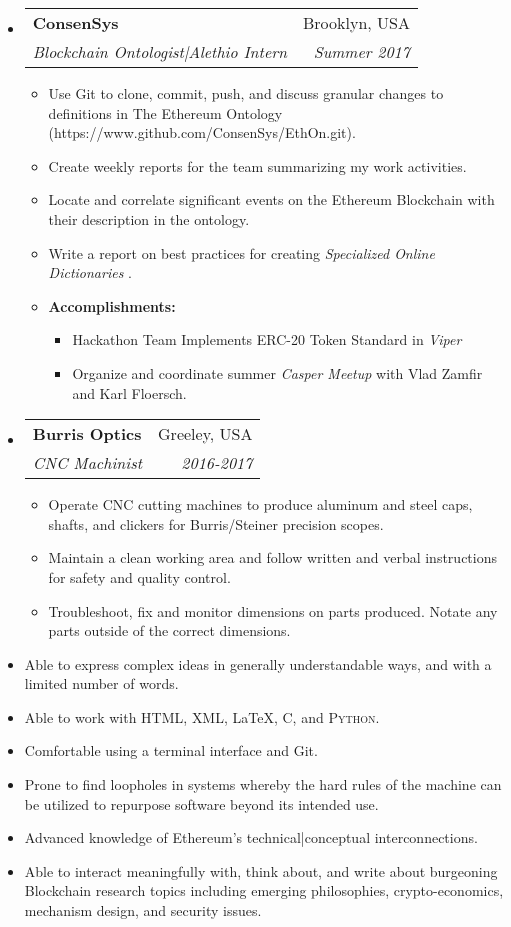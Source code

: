 \documentclass[letterpaper,10pt]{article}
\makeatletter
\newlength{\outerbordwidth}
\newcommand{\resitem}[1]{\item #1 \vspace{-2pt}}
\newcommand{\resheading}[1]{\vspace{8pt}
  \parbox{\textwidth}{\setlength{\FrameSep}{\outerbordwidth}
    \begin{shaded}
\setlength{\fboxsep}{0pt}\framebox[\textwidth][l]{\setlength{\fboxsep}{4pt}\fcolorbox{shadecolorB}{shadecolorB}{\textbf{\sffamily{\mbox{~}\makebox[6.762in][l]{\large #1} \vphantom{p\^{E}}}}}}
    \end{shaded}
  }\vspace{-5pt}
}
\newcommand{\ressubheading}[4]{
\begin{tabular*}{6.5in}{l@{\cftdotfill{\cftsecdotsep}\extracolsep{\fill}}r}
		\textbf{#1} & #2 \\
		\textit{#3} & \textit{#4} \\
\end{tabular*}\vspace{-6pt}}
\makeatother
\begin{document}
\begin{itemize}

	\item \ressubheading{ConsenSys}{Brooklyn, USA}{Blockchain Ontologist|Alethio Intern}{Summer 2017}

\begin{itemize}
	\resitem{Use Git to clone, commit, push, and discuss granular changes to definitions in The Ethereum Ontology (https://www.github.com/ConsenSys/EthOn.git).} 
	\resitem{Create weekly reports for the team summarizing my work activities.}
	\resitem{Locate and correlate significant events on the Ethereum Blockchain with their description in the ontology.}
	\resitem{Write a report on best practices for creating \textit{Specialized Online Dictionaries}}.
	\resitem{\textbf{Accomplishments:}}
		\begin{itemize}
				\resitem{Hackathon Team Implements ERC-20 Token Standard in \textit{Viper}}
				\resitem{Organize and coordinate summer \textit{Casper Meetup} with Vlad Zamfir and Karl Floersch.}
		\end{itemize}
\end{itemize}

\item \ressubheading{Burris Optics}{Greeley, USA}{CNC Machinist}{2016-2017}

	\begin{itemize}
		\resitem{Operate CNC cutting machines to produce aluminum and steel caps, shafts, and clickers for Burris/Steiner precision scopes.}
		\resitem{Maintain a clean working area and follow written and verbal instructions for safety and quality control.}
		\resitem{Troubleshoot, fix and monitor dimensions on parts produced. Notate any parts outside of the correct dimensions.}
	\end{itemize}

\end{itemize}


\resheading{Skills}

\begin{itemize}
	\resitem{Able to express complex ideas in generally understandable ways, and with a limited number of words.}
	\resitem{Able to work with \textsc{HTML}, \textsc{XML}, \LaTeX, \textsc{C}, and \textsc{Python}. }
	\resitem{Comfortable using a terminal interface and Git.}
	\resitem{Prone to find loopholes in systems whereby the hard rules of the machine can be utilized to repurpose software beyond its intended use.}
	\resitem{Advanced knowledge of Ethereum's technical|conceptual interconnections.}
	\resitem{Able to interact meaningfully with, think about, and write about burgeoning Blockchain research topics including emerging philosophies, crypto-economics, mechanism design, and security issues.}
\end{itemize}
\end{document}

